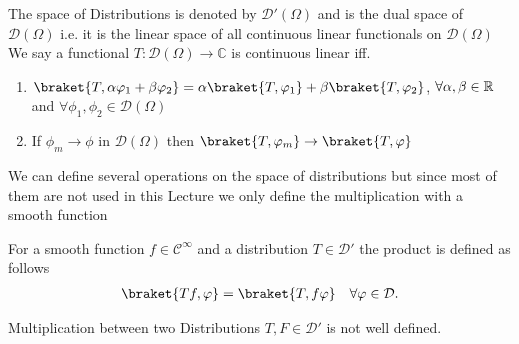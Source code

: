\begin{definition}[Distribution]
 The space of Distributions is denoted by $\mathcal{D}'(\Omega )$  and is the dual space of $\mathcal{D}(\Omega)$
 i.e. it is the linear space of all continuous linear functionals on $\mathcal{D}(\Omega )$ \\[1ex]
 We say a functional $T :\mathcal{D}(\Omega ) \to \mathbb{C}$ is continuous linear iff. 
 \begin{enumerate}
   \item $\braket{T,\alpha \phi_1+ \beta \phi_2} = \alpha \braket{T,\phi_1} + \beta \braket{T,\phi_2}$, $\forall \alpha,\beta\in \mathbb{R}$ and $\forall \phi_1,\phi_2\in\mathcal{D}(\Omega)$
   \item If $\phi_m \to  \phi $ in $\mathcal{D}(\Omega )$ then $\braket{T,\phi_m} \to \braket{T,\phi }$
 \end{enumerate}
\end{definition}
We can define several operations on the space of distributions but since most of them are not used in this Lecture 
we only define the multiplication with a smooth function 
\begin{definition}
For a smooth function $f \in  \mathcal{C}^{\infty} $ and a distribution $T \in \mathcal{D}'$ the product is defined as follows 
\begin{align*}
  \braket{Tf,\phi } = \braket{T,f \phi} \quad \forall \phi  \in  \mathcal{D}
.\end{align*}
\end{definition}
\begin{remark}
 Multiplication between two Distributions $T,F \in  \mathcal{D}'$ is not well defined.
\end{remark}

